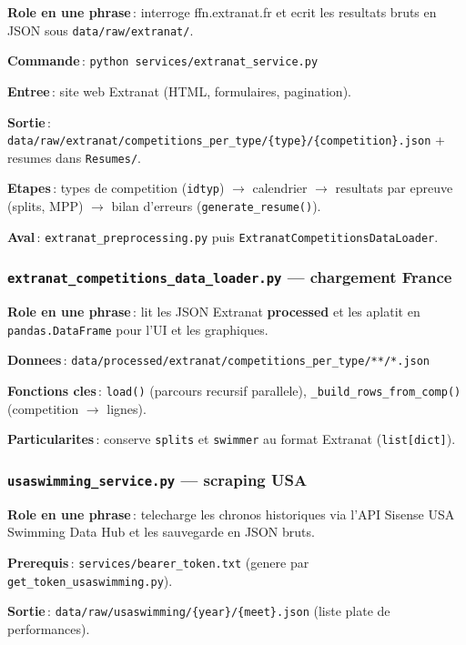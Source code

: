\documentclass[11pt,a4paper]{article}
\begin{document}
\textbf{Role en une phrase}\,: interroge ffn.extranat.fr et ecrit les resultats bruts en JSON sous \texttt{data/raw/extranat/}.

\textbf{Commande}\,: \texttt{python services/extranat\_service.py}

\textbf{Entree}\,: site web Extranat (HTML, formulaires, pagination).

\textbf{Sortie}\,: \texttt{data/raw/extranat/competitions\_per\_type/\{type\}/\{competition\}.json} + resumes dans \texttt{Resumes/}.

\textbf{Etapes}\,: types de competition (\texttt{idtyp}) $\rightarrow$ calendrier $\rightarrow$ resultats par epreuve (splits, MPP) $\rightarrow$ bilan d'erreurs (\texttt{generate\_resume()}).

\textbf{Aval}\,: \texttt{extranat\_preprocessing.py} puis \texttt{ExtranatCompetitionsDataLoader}.

\subsubsection{\texttt{extranat\_competitions\_data\_loader.py} --- chargement France}

\textbf{Role en une phrase}\,: lit les JSON Extranat \textbf{processed} et les aplatit en \texttt{pandas.DataFrame} pour l'UI et les graphiques.

\textbf{Donnees}\,: \texttt{data/processed/extranat/competitions\_per\_type/**/*.json}

\textbf{Fonctions cles}\,: \texttt{load()} (parcours recursif parallele), \texttt{\_build\_rows\_from\_comp()} (competition $\rightarrow$ lignes).

\textbf{Particularites}\,: conserve \texttt{splits} et \texttt{swimmer} au format Extranat (\texttt{list[dict]}).

\subsubsection{\texttt{usaswimming\_service.py} --- scraping USA}

\textbf{Role en une phrase}\,: telecharge les chronos historiques via l'API Sisense USA Swimming Data Hub et les sauvegarde en JSON bruts.

\textbf{Prerequis}\,: \texttt{services/bearer\_token.txt} (genere par \texttt{get\_token\_usaswimming.py}).

\textbf{Sortie}\,: \texttt{data/raw/usaswimming/\{year\}/\{meet\}.json} (liste plate de performances).
\end{document}
